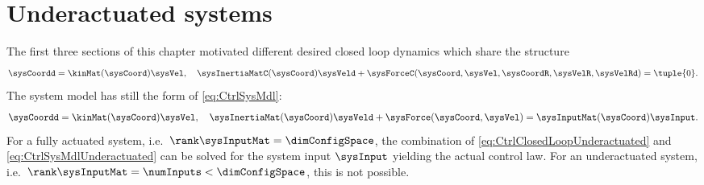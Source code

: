 \section{Underactuated systems}\label{sec:CtrlUnderactuated}
The first three sections of this chapter motivated different desired closed loop dynamics which share the structure
\begin{align}\label{eq:CtrlClosedLoopUnderactuated}
 \sysCoordd = \kinMat(\sysCoord) \sysVel, 
\quad
 \sysInertiaMatC(\sysCoord) \sysVeld + \sysForceC(\sysCoord, \sysVel, \sysCoordR, \sysVelR, \sysVelRd) = \tuple{0}.
\end{align}
The system model has still the form of \eqref{eq:CtrlSysMdl}:
\begin{align}\label{eq:CtrlSysMdlUnderactuated}
 \sysCoordd = \kinMat(\sysCoord) \sysVel, 
\quad
 \sysInertiaMat(\sysCoord) \sysVeld + \sysForce(\sysCoord, \sysVel) = \sysInputMat(\sysCoord) \sysInput.
\end{align}
For a fully actuated system, i.e.\ $\rank\sysInputMat = \dimConfigSpace$, the combination of \eqref{eq:CtrlClosedLoopUnderactuated} and \eqref{eq:CtrlSysMdlUnderactuated} can be solved for the system input $\sysInput$ yielding the actual control law.
For an underactuated system, i.e.\ $\rank\sysInputMat = \numInputs < \dimConfigSpace$, this is not possible.



